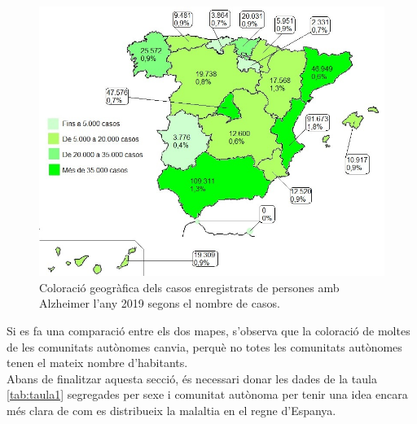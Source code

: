 \documentclass[a4paper,12pt]{article}
\begin{document}
\begin{figure}[H]
    \centering
    \includegraphics[scale = 0.6]{images/distribucio territorial en base a casos.jpg}
    \caption{Coloració geogràfica dels casos enregistrats de persones amb Alzheimer l'any 2019 segons el nombre de casos.}
    \label{fig:colorcasos}
\end{figure}
Si es fa una comparació entre els dos mapes, s'observa que la coloració de moltes de les comunitats autònomes canvia, perquè no totes les comunitats autònomes tenen el mateix nombre d'habitants.\\
Abans de finalitzar aquesta secció, és necessari donar les dades de la taula \ref{tab:taula1} segregades per sexe i comunitat autònoma per tenir una idea encara més clara de com es distribueix la malaltia en el regne d'Espanya.
\end{document}
